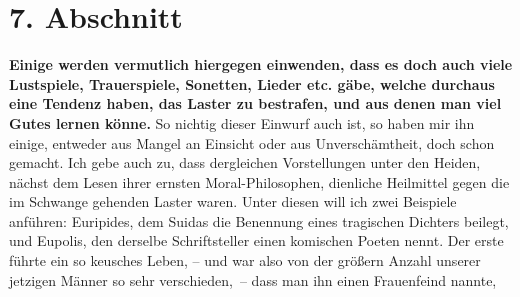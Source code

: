 \section{7. Abschnitt} \label{kap17_ab7}

\label{ref:17_07_einwand}
\textbf{Einige werden vermutlich hiergegen einwenden, dass es doch auch viele
Lustspiele, Trauerspiele, Sonetten, Lieder etc. gäbe, welche durchaus eine
Tendenz haben, das Laster zu bestrafen, und aus denen man viel Gutes lernen
könne.} So nichtig dieser Einwurf auch ist, so haben mir ihn einige, entweder
aus
Mangel an Einsicht oder aus Unverschämtheit, doch schon gemacht. Ich gebe
auch zu, dass dergleichen Vorstellungen unter den Heiden, nächst dem Lesen ihrer
ernsten Moral-Philosophen, dienliche Heilmittel gegen die im Schwange gehenden
Laster waren. Unter diesen will ich zwei Beispiele anführen:
Euripides, dem
Suidas die Benennung eines tragischen Dichters beilegt, und
Eupolis, den
derselbe Schriftsteller einen komischen Poeten nennt. Der erste führte ein so
keusches Leben, -- und war also von der größern Anzahl unserer jetzigen Männer
so sehr verschieden,~-- dass man ihn einen
Frauenfeind nannte,

\medskip

